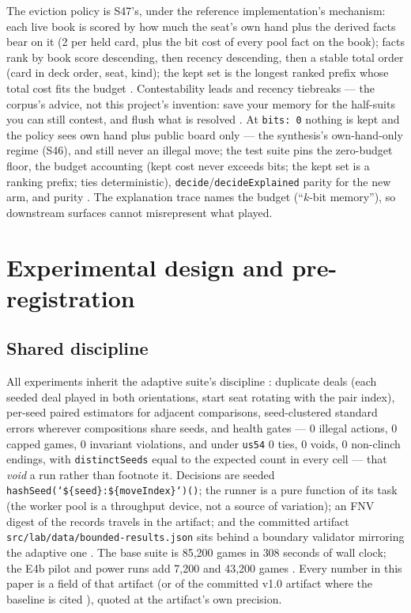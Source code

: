 \documentclass[11pt]{article}
\newcommand{\code}[1]{\texttt{#1}}
\newcommand{\usff}{\code{us54}}
\begin{document}
The eviction policy is S47's, under the reference implementation's mechanism: each live
book is scored by how much the seat's own hand plus the derived facts bear on it (2 per
held card, plus the bit cost of every pool fact on the book); facts rank by book score
descending, then recency descending, then a stable total order (card in deck order,
seat, kind); the kept set is the longest ranked prefix whose total cost fits the budget
\cite{repo,playstyles}. Contestability leads and recency tiebreaks --- the corpus's
advice, not this project's invention: save your memory for the half-suits you can still
contest, and flush what is resolved \cite{playstyles}. At \code{bits: 0} nothing is
kept and the policy sees own hand plus public board only --- the synthesis's
own-hand-only regime (S46), and still never an illegal move; the test suite pins the
zero-budget floor, the budget accounting (kept cost never exceeds bits; the kept set is
a ranking prefix; ties deterministic), \code{decide}/\code{decideExplained} parity for
the new arm, and purity \cite{repo}. The explanation trace names the budget
(``$k$-bit memory''), so downstream surfaces cannot misrepresent what played.

\section{Experimental design and pre-registration}
\label{sec:design}

\subsection{Shared discipline}
\label{sec:discipline}

All experiments inherit the adaptive suite's discipline \cite{v10paper,botlab}:
duplicate deals (each seeded deal played in both orientations, start seat rotating with
the pair index), per-seed paired estimators for adjacent comparisons, seed-clustered
standard errors wherever compositions share seeds, and health gates --- 0 illegal
actions, 0 capped games, 0 invariant violations, and under \usff{} 0 ties, 0 voids, 0
non-clinch endings, with \code{distinctSeeds} equal to the expected count in every cell
--- that \emph{void} a run rather than footnote it. Decisions are seeded
\code{hashSeed(`\$\{seed\}:\$\{moveIndex\}`)()}; the runner is a pure function of its
task (the worker pool is a throughput device, not a source of variation); an FNV digest
of the records travels in the artifact; and the committed artifact
\code{src/lab/data/bounded-results.json} sits behind a boundary validator mirroring the
adaptive one \cite{artifact,repo}. The base suite is 85{,}200 games in $308$ seconds of
wall clock; the E4b pilot and power runs add 7{,}200 and 43{,}200 games
\cite{artifact}. Every number in this paper is a field of that artifact (or of the
committed v1.0 artifact where the baseline is cited \cite{adaptiveartifact}), quoted at
the artifact's own precision.
\end{document}
